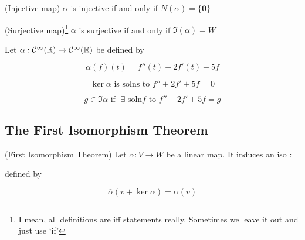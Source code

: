 \documentclass[a4paper]{article}
\begin{document}
\begin{defi} (Injective map)
	$ \alpha $ is injective if and only if $ N(\alpha) = \{ \mathbf{0} \} $
\end{defi}

\begin{defi} (Surjective map)\footnote{I mean, all definitions are iff statements really. Sometimes we leave it out and just use `if'}
$ 	\alpha $  is surjective if and only if $ \Im(\alpha) = W $
\end{defi}

\begin{eg}
	Let $ \alpha : {\mathcal{C}^{\infty}} (\mathbb{R}) \to \mathcal{C}^{\infty} (\mathbb{R}) $ be defined by 
	
	\[ \alpha(f)(t) = f''(t) + 2f'(t) - 5f  \] 
	
	
	\[  \ker \alpha \text{ is solns to } f'' + 2f' + 5f = 0 \]
	
	\[ g \in \Im \alpha \text{ if } \; \exists \text{ soln} f \text{ to } f'' + 2f' + 5f = g  \]
\end{eg}

\subsection{The First Isomorphism Theorem}

\begin{thm} (First Isomorphism Theorem)
	Let $ \alpha : V \to W $ be a linear map. It induces an iso :
	
	\begin{center}
	\end{center}

	defined by
	
	
	\[ \overline{\alpha} (v + \ker \alpha) = \alpha(v) \]
	
	
\end{thm}
\end{document}
